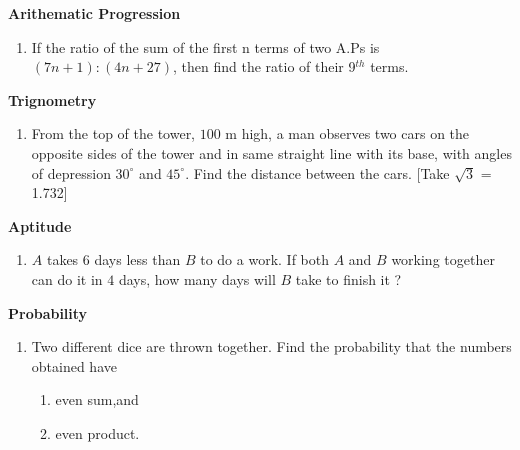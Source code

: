 \documentclass{article}                                                                                                                                   \usepackage{graphicx}
\begin{document}
\begin{center}
\textbf {Arithematic Progression}
\end{center}                                                                                                                                              \begin {enumerate}
\item If the ratio of the sum of the first n terms of two A.Ps is $(7n+1):(4n+27)$, then find the ratio of their 9$^{th}$ terms.
\end {enumerate}                                                                                                                                                                                                                                                                                                    \begin{center}
\textbf{Trignometry}
\end{center}                                                                                                                                              \begin {enumerate}                                                                                                                                                                                                                                                                                                  \item From the top of the tower, $100$ m high, a man observes two cars on the opposite sides of the tower and in same straight line with its base, with angles of depression $30^{\circ}$ and $45^{\circ}$. Find the distance between the cars. [Take $\sqrt{3}$ = 1.732]

\end {enumerate}
\begin{center}
\textbf {Aptitude}                                                                                                                                        \end{center}
\begin {enumerate}
\item $A$ takes $6$ days less than $B$ to do a work. If both $A$ and $B$ working together can do it in $4$ days, how many days will $B$ take to finish it ?
        \end {enumerate}
 \begin{center}
\textbf{Probability}
\end{center}
\begin {enumerate}
                                                                                                                                                          \item Two different dice are thrown together. Find the probability that the numbers obtained have \begin{enumerate}[label=(\roman*)]                  \item even sum,and                            \item even product.                                   \end{enumerate}                                           \end {enumerate}
\end{document}
